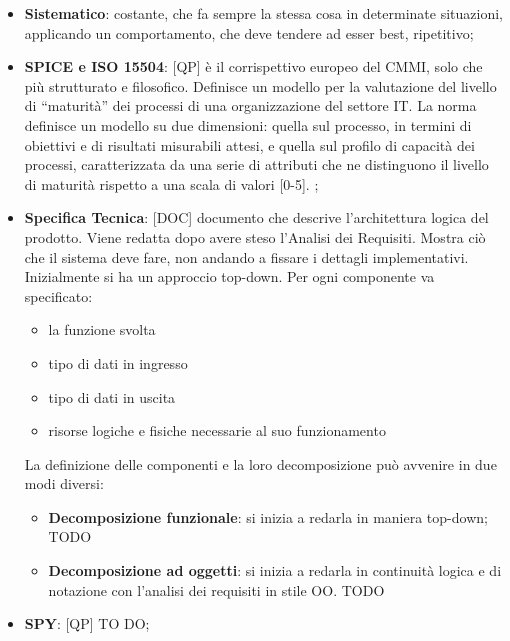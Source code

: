\begin{itemize}
	\item \textbf{Sistematico}: costante, che fa sempre la stessa cosa in determinate situazioni, applicando un comportamento, che deve tendere ad esser best, ripetitivo;
	\item \textbf{SPICE e ISO 15504}: [QP] è il corrispettivo europeo del CMMI, solo che più strutturato e filosofico. Definisce un modello per la valutazione del livello di ``maturità'' dei processi di una organizzazione del settore IT. \newline
	La norma definisce un modello su due dimensioni: quella sul processo, in termini di obiettivi e di risultati misurabili attesi, e quella sul profilo di capacità dei processi, caratterizzata da una serie di attributi che ne distinguono il livello di maturità rispetto a una scala di valori [0-5]. ;


	\item \textbf{Specifica Tecnica}: [DOC] documento che descrive l'architettura logica del prodotto. Viene redatta dopo avere steso l'Analisi dei Requisiti. Mostra ciò che il sistema deve fare, non andando a fissare i dettagli implementativi. Inizialmente si ha un approccio top-down. Per ogni componente va specificato:
		\begin{itemize}
			\item la funzione svolta
			\item tipo di dati in ingresso
			\item tipo di dati in uscita
			\item risorse logiche e fisiche necessarie al suo funzionamento
		\end{itemize}
		\noindent
		La definizione delle componenti e la loro decomposizione può avvenire in due modi diversi:
		\begin{itemize}
			\item \textbf{Decomposizione funzionale}: si inizia a redarla in maniera top-down; TODO
			\item \textbf{Decomposizione ad oggetti}: si inizia a redarla in continuità logica e di notazione con l'analisi dei requisiti in stile OO. TODO
		\end{itemize}


	\item \textbf{SPY}: [QP] TO DO;


\end{itemize}
